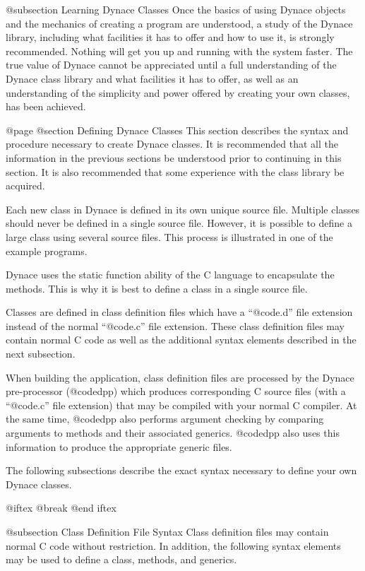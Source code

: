 @subsection Learning Dynace Classes
Once the basics of using Dynace objects and the mechanics of creating a
program are understood, a study of the Dynace library, including what
facilities it has to offer and how to use it, is strongly recommended.
Nothing will get you up and running with the system faster.  The true
value of Dynace cannot be appreciated until a full understanding of the Dynace
class library and what facilities it has to offer, as well as an
understanding of the simplicity and power offered by creating your own
classes, has been achieved.

@page
@section Defining Dynace Classes
This section describes the syntax and procedure necessary to create
Dynace classes.  It is recommended that all the information in the
previous sections be understood prior to continuing in this section.  It
is also recommended that some experience with the class library be
acquired.

Each new class in Dynace is defined in its own unique source file.
Multiple classes should never be defined in a single source file.
However, it is possible to define a large class using several source files.
This process is illustrated in one of the example programs.

Dynace uses the static function ability of the C language to encapsulate
the methods.  This is why it is best to define a class in a single
source file.

Classes are defined in class definition files which have a
``@code{.d}'' file extension instead of the normal ``@code{.c}''
file extension.  These class definition files may contain normal
C code as well as the additional syntax elements described in the
next subsection.

When building the application, class definition files are processed
by the Dynace pre-processor (@code{dpp}) which produces corresponding
C source files (with a ``@code{.c}'' file extension) that may be
compiled with your normal C compiler.  At the same time, @code{dpp}
also performs argument checking by comparing arguments to methods
and their associated generics.  @code{dpp} also uses this information
to produce the appropriate generic files.


The following subsections describe the exact syntax
necessary to define your own Dynace classes.

@iftex
@break
@end iftex

@subsection Class Definition File Syntax
Class definition files may contain normal C code without restriction.
In addition, the following syntax elements may be used to define a class,
methods, and generics.


